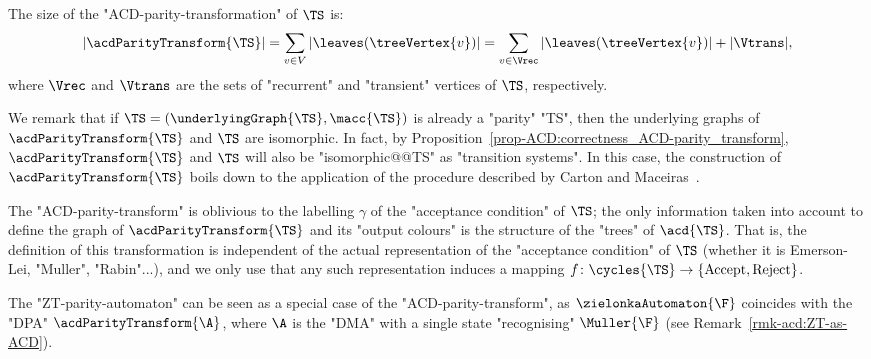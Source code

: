\documentclass[10pt,a4paper]{amsart}
\renewcommand{\gg}{\gamma}
\begin{document}
\begin{remark}\label{rmk-acd:size_ACD-parity-transformation}
	The size of the "ACD-parity-transformation" of $\TS$ is:
	\[|\acdParityTransform{\TS}| = \sum_{v\in V} |  \leaves(\treeVertex{v}) | = \sum_{v\in \Vrec}|  \leaves(\treeVertex{v}) | + |\Vtrans|,\]
	where $\Vrec$ and $\Vtrans$ are the sets of "recurrent" and "transient" vertices of $\TS$, respectively.
\end{remark}

\begin{remark}\label{rmk-acd:acd-transform-parity-is-parity}
	We remark that if $\TS = (\underlyingGraph{\TS}, \macc{\TS})$ is already a "parity" "TS", then the underlying graphs of $\acdParityTransform{\TS}$ and $\TS$ are isomorphic. In fact, by Proposition~\ref{prop-ACD:correctness_ACD-parity_transform}, $\acdParityTransform{\TS}$ and $\TS$ will also be "isomorphic@@TS" as "transition systems".
	In this case, the construction of $\acdParityTransform{\TS}$ boils down to the application of the procedure described by Carton and Maceiras~\cite{CartonMaceiras99RabinIndex}.
\end{remark}

\begin{remark}\label{rmk-acd:oblivious-to-representation}
	The "ACD-parity-transform" is oblivious to the labelling $\gg$ of the "acceptance condition" of $\TS$; the only information taken into account to define the graph of $\acdParityTransform{\TS}$ and its "output colours" is the structure of the "trees" of $\acd{\TS}$.
	That is, the definition of this transformation is independent of the actual representation of the "acceptance condition" of $\TS$ (whether it is Emerson-Lei, "Muller", "Rabin"...), and we only use that any such representation induces a mapping $f\colon \cycles{\TS} \to \{\mathrm{Accept}, \mathrm{Reject} \}$.
\end{remark}

\begin{remark}
	The "ZT-parity-automaton" can be seen as a special case of the "ACD-parity-transform", as $\zielonkaAutomaton{\F}$ coincides with the "DPA" $\acdParityTransform{\A}$, where $\A$ is the "DMA" with a single state "recognising" $\Muller{\F}$ (see Remark~\ref{rmk-acd:ZT-as-ACD}).
\end{remark}
\end{document}

